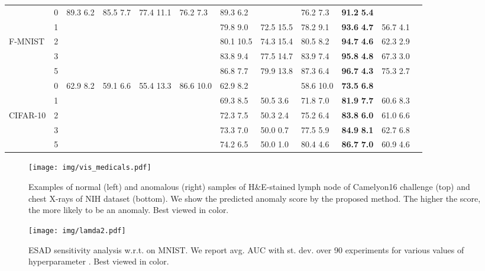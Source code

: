 \documentclass{bmvc2k}
\begin{document}
\begin{table*}[!htb]
{\begin{tabular}{C{1.2cm}C{0.5cm}C{1.0cm}C{1.0cm}C{1.0cm}C{1.0cm}C{1.0cm}C{1.0cm}C{1.0cm}C{1.0cm}C{1.0cm}C{1.0cm}}
\cmidrule(lr){10-10}
\cmidrule(lr){11-11} 
 & 0 & 89.3  6.2 & 85.5  7.7 & 77.4  11.1 & 76.2  7.3 & 89.3  6.2 & & 76.2  7.3 & \textbf{91.2}  \textbf{5.4} &\\
 & 1 & & & & & 79.8  9.0 & 72.5  15.5 & 78.2  9.1 & \textbf{93.6}  \textbf{4.7} & 56.7  4.1 \\
F-MNIST  & 2 & & & & & 80.1  10.5 & 74.3  15.4 & 80.5  8.2 & \textbf{94.7}  \textbf{4.6} & 62.3  2.9 \\
 & 3 & & & & & 83.8  9.4 & 77.5  14.7 & 83.9  7.4 & \textbf{95.8}  \textbf{4.8} & 67.3  3.0 \\
 & 5 & & & & & 86.8  7.7 & 79.9  13.8 & 87.3  6.4 & \textbf{96.7}  \textbf{4.3} & 75.3  2.7 \\
\cmidrule(lr){1-1} \cmidrule(lr){2-2} \cmidrule(lr){3-3} \cmidrule(lr){4-4} \cmidrule(lr){5-5} \cmidrule(lr){6-6} \cmidrule(lr){7-7} \cmidrule(lr){8-8} \cmidrule(lr){9-9} 
\cmidrule(lr){10-10}
\cmidrule(lr){11-11} 
 & 0 & 62.9  8.2 & 59.1  6.6 & 55.4  13.3 & 86.6  10.0 & 62.9  8.2 & & 58.6  10.0 & \textbf{73.5}  \textbf{6.8} & \\
 & 1 & & & & & 69.3  8.5 & 50.5  3.6 & 71.8  7.0 & \textbf{81.9}  \textbf{7.7} & 60.6  8.3 \\
CIFAR-10 & 2 & & & & & 72.3  7.5 & 50.3  2.4 & 75.2  6.4 & \textbf{83.8}  \textbf{6.0} & 61.0  6.6 \\
 & 3 & & & &  & 73.3  7.0 & 50.0  0.7 & 77.5  5.9 & \textbf{84.9}  \textbf{8.1} & 62.7  6.8 \\
 & 5 & & & & & 74.2  6.5 & 50.0  1.0 & 80.4  4.6 & \textbf{86.7}  \textbf{7.0} & 60.9  4.6 \\
\bottomrule
\end{tabular}}
\end{table*}

\begin{figure*}[t]
\centering
\texttt{[image: img/vis\_medicals.pdf]}
\caption{Examples of normal (left) and anomalous (right) samples of H\&E-stained lymph node of Camelyon16 challenge \cite{bejnordi2017diagnostic} (top) and chest X-rays of NIH dataset \cite{wang2017chestx} (bottom). We show the predicted anomaly score by the proposed method. The higher the score, the more likely to be an anomaly. Best viewed in color.}
\label{img:vis_medical}
\end{figure*}

\begin{figure}[t]
\centering
\texttt{[image: img/lamda2.pdf]}
\caption{ESAD sensitivity analysis w.r.t.  on MNIST. We report avg. AUC with st. dev. over 90 experiments for various values of hyperparameter . Best viewed in color.}
\label{img:lamda2}
\vspace{-5pt}
\end{figure}
\end{document}
